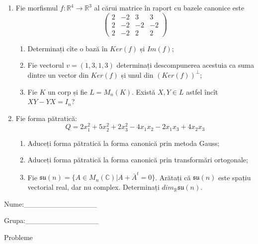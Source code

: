 \documentclass{article}
\begin{document}
\begin{enumerate}
 \item Fie morfismul $f:\mathbb{R}^4 \to \mathbb{R}^3$ al cărui matrice în raport cu bazele canonice este
$$\begin{pmatrix}
2&-2&3&3\\
2&-2&-2&-2\\
2&-2&2&2
\end{pmatrix}$$

\begin{enumerate}
\item Determinați cîte o bază în $Ker(f)$ și $Im(f)$;
\item Fie vectorul $v=(1,3,1,3)$ determinați descompunerea acestuia ca suma dintre un vector din $Ker(f)$ și unul din $(Ker(f))^\perp$;
\item Fie $K$ un corp și fie $L=M_n(K)$. Există $X,Y \in L$ astfel încît $XY-YX=I_n$?  
\end{enumerate}
\item Fie forma pătratică:
$$Q= 2x_1^2+5x_2^2+2x_3^2-4x_1x_2-2x_1x_3+4x_2x_3$$

\begin{enumerate}
\item Aduceți forma pătratică la forma canonică prin metoda Gauss;
\item Aduceți forma pătratică la forma canonică prin transformări ortogonale;
\item Fie $\mathfrak{su}(n)=\{ A \in M_n(\mathbb{C}) | A+\bar{A}^t=0\}$. Arătați că $\mathfrak{su}(n)$ este spațiu vectorial real, dar nu complex.
Determinați $dim_{\mathbb{R}}\mathfrak{su}(n)$.
\end{enumerate}
\end{enumerate}
\newpage
\begin{flushright}
Nume:\_\_\_\_\_\_\_\_\_\_\_\_\_\_
 
 
Grupa:\_\_\_\_\_\_\_\_\_\_\_\_\_\_
\end{flushright}
\begin{center}
\vspace{2cm}
{\Large Probleme}
\vspace{2cm}
\end{center}
\end{document}
